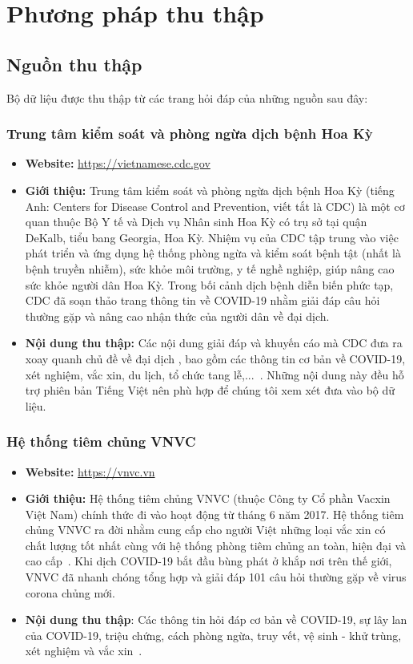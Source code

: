 \documentclass[runningheads]{llncs}
\begin{document}
\section{Phương pháp thu thập}
\subsection{Nguồn thu thập}
Bộ dữ liệu được thu thập từ các trang hỏi đáp của những nguồn sau đây:

\subsubsection{Trung tâm kiểm soát và phòng ngừa dịch bệnh Hoa Kỳ}
\begin{itemize}
\item \textbf{Website:} \url{https://vietnamese.cdc.gov}
\item \textbf{Giới thiệu:}
Trung tâm kiểm soát và phòng ngừa dịch bệnh Hoa Kỳ (tiếng Anh: Centers for Disease Control and Prevention, viết tắt là CDC) là một cơ quan thuộc Bộ Y tế và Dịch vụ Nhân sinh Hoa Kỳ có trụ sở tại quận DeKalb, tiểu bang Georgia, Hoa Kỳ. Nhiệm vụ của CDC tập trung vào việc phát triển và ứng dụng hệ thống phòng ngừa và kiểm soát bệnh tật (nhất là bệnh truyền nhiễm), sức khỏe môi trường, y tế nghề nghiệp, giúp nâng cao sức khỏe người dân Hoa Kỳ. Trong bối cảnh dịch bệnh diễn biến phức tạp, CDC đã soạn thảo trang thông tin về COVID-19 nhằm giải đáp câu hỏi thường gặp và nâng cao nhận thức của người dân về đại dịch. 

\item \textbf{Nội dung thu thập:} Các nội dung giải đáp và khuyến cáo mà CDC đưa ra xoay quanh chủ đề về đại dịch , bao gồm các thông tin cơ bản về COVID-19, xét nghiệm, vắc xin, du lịch, tổ chức tang lễ,...~\cite{ref_url7}. Những nội dung này đều hỗ trợ phiên bản Tiếng Việt nên phù hợp để chúng tôi xem xét đưa vào bộ dữ liệu.
\end{itemize}


\subsubsection{Hệ thống tiêm chủng VNVC}
\begin{itemize}
\item \textbf{Website:} \url{https://vnvc.vn}
\item \textbf{Giới thiệu:}
Hệ thống tiêm chủng VNVC (thuộc Công ty Cổ phần Vacxin Việt Nam) chính thức đi vào hoạt động từ tháng 6 năm 2017. Hệ thống tiêm chủng VNVC ra đời nhằm cung cấp cho người Việt những loại vắc xin có chất lượng tốt nhất cùng với hệ thống phòng tiêm chủng an toàn, hiện đại và cao cấp~\cite{ref_url2}. Khi dịch COVID-19 bắt đầu bùng phát ở khắp nơi trên thế giới, VNVC đã nhanh chóng tổng hợp và giải đáp 101 câu hỏi thường gặp về virus corona chủng mới.

\item \textbf{Nội dung thu thập}: Các thông tin hỏi đáp cơ bản về COVID-19, sự lây lan của COVID-19, triệu chứng, cách phòng ngừa, truy vết, vệ sinh - khử trùng, xét nghiệm và vắc xin~\cite{ref_url8}.

\end{itemize}
\end{document}
